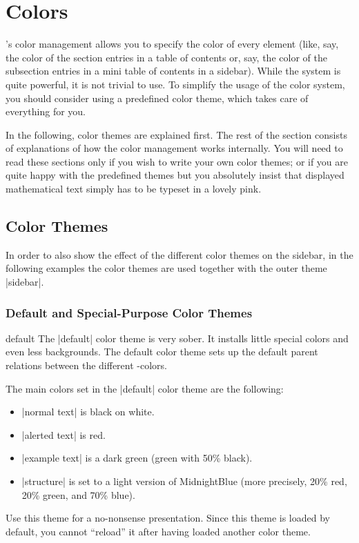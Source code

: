 
%

\section{Colors}

\label{section-colors}

\beamer's color management allows you to specify the color of every
element (like, say, the color of the section entries in a table of
contents or, say, the color of the subsection entries in a mini table
of contents in a sidebar). While the system is quite powerful, it is
not trivial to use. To simplify the usage of the color system, you
should consider using a predefined color theme, which takes care of
everything for you.

In the following, color themes are explained first. The rest of the
section consists of explanations of how the color management works
internally. You will need to read these sections only if you wish to
write your own color themes; or if you are quite happy with the
predefined themes but you absolutely insist that displayed
mathematical text simply has to be typeset in a lovely pink.



\subsection{Color Themes}

In order to also show the effect of the different color themes on the
sidebar, in the following examples the color themes are used together
with the outer theme |sidebar|.

\subsubsection{Default and Special-Purpose Color Themes}

\begin{colorthemeexample}{default}
  The |default| color theme is very sober. It installs little special
  colors and even less backgrounds. The default color theme sets up
  the default parent relations between the different \beamer-colors.

  The main colors set in the |default| color theme are the following: 
  \begin{itemize}
  \item
    |normal text| is black on white.
  \item
    |alerted text| is red.
  \item
    |example text| is a dark green (green with 50\% black).
  \item
    |structure| is set to a light version of MidnightBlue
    (more precisely, 20\% red, 20\% green, and 70\% blue).  
  \end{itemize}
  Use this theme for a no-nonsense presentation. Since this theme is
  loaded by default, you cannot ``reload'' it after having loaded
  another color theme.
\end{colorthemeexample}

